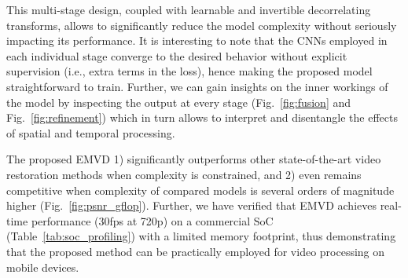 \documentclass[final]{cvpr}
\newcommand{\textapprox}{}
\begin{document}
    This multi-stage design, coupled with learnable and invertible decorrelating transforms, allows to significantly reduce the model complexity without seriously impacting its performance. It is interesting to note that the CNNs employed in each individual stage converge to the desired behavior without explicit supervision (i.e., extra terms in the loss), hence making the proposed model straightforward to train. Further, we can gain insights on the inner workings of the model by inspecting the output at every stage (Fig.~\ref{fig:fusion} and Fig.~\ref{fig:refinement}) which in turn allows to interpret and disentangle the effects of spatial and temporal processing.
    
    The proposed EMVD 1) significantly outperforms other state-of-the-art video restoration methods when complexity is constrained, and 2) even remains competitive when complexity of compared models is several orders of magnitude higher (Fig.~\ref{fig:psnr_gflop}). Further, we have verified that EMVD achieves real-time performance (\textapprox30fps at 720p) on a commercial SoC (Table~\ref{tab:soc_profiling}) with a limited memory footprint, thus demonstrating that the proposed method can be practically employed for video processing on mobile devices.
    
    
    {\small
        
        
    }
    
\end{document}

